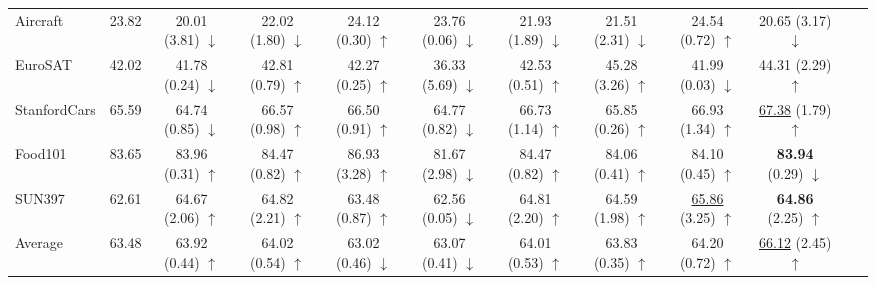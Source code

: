 {\begin{table*}[h!]
\begin{tabular}{lccccccccccc}
Aircraft & 23.82 & 20.01 {\scriptsize (3.81) $\downarrow$} & 22.02 {\scriptsize (1.80) $\downarrow$} & 24.12 {\scriptsize (0.30) $\uparrow$} & 23.76 {\scriptsize (0.06) $\downarrow$} & 21.93 {\scriptsize (1.89) $\downarrow$} & 21.51 {\scriptsize (2.31) $\downarrow$} & 24.54 {\scriptsize (0.72) $\uparrow$} & 20.65 {\scriptsize (3.17) $\downarrow$}  \\
EuroSAT & 42.02 & 41.78 {\scriptsize (0.24) $\downarrow$} & 42.81 {\scriptsize (0.79) $\uparrow$} & 42.27 {\scriptsize (0.25) $\uparrow$} & 36.33 {\scriptsize (5.69) $\downarrow$} & 42.53 {\scriptsize (0.51) $\uparrow$} & 45.28 {\scriptsize (3.26) $\uparrow$} & 41.99 {\scriptsize (0.03) $\downarrow$} & 44.31 {\scriptsize (2.29) $\uparrow$}  \\
StanfordCars & 65.59 & 64.74 {\scriptsize (0.85) $\downarrow$} & 66.57 {\scriptsize (0.98) $\uparrow$} & 66.50 {\scriptsize (0.91) $\uparrow$} & 64.77 {\scriptsize (0.82) $\downarrow$} & 66.73 {\scriptsize (1.14) $\uparrow$} & 65.85 {\scriptsize (0.26) $\uparrow$} & 66.93 {\scriptsize (1.34) $\uparrow$} & \underline{67.38} {\scriptsize (1.79) $\uparrow$}  \\
Food101 & 83.65 & 83.96 {\scriptsize (0.31) $\uparrow$} & 84.47 {\scriptsize (0.82) $\uparrow$} & 86.93 {\scriptsize (3.28) $\uparrow$} & 81.67 {\scriptsize (2.98) $\downarrow$} & 84.47 {\scriptsize (0.82) $\uparrow$} & 84.06 {\scriptsize (0.41) $\uparrow$} & 84.10 {\scriptsize (0.45) $\uparrow$} & \textbf{83.94} {\scriptsize (0.29) $\downarrow$} \\
SUN397 & 62.61 & 64.67 {\scriptsize (2.06) $\uparrow$} & 64.82 {\scriptsize (2.21) $\uparrow$} & 63.48 {\scriptsize (0.87) $\uparrow$} & 62.56 {\scriptsize (0.05) $\downarrow$} & 64.81 {\scriptsize (2.20) $\uparrow$} & 64.59 {\scriptsize (1.98) $\uparrow$}  & \underline{65.86} {\scriptsize (3.25) $\uparrow$} & \textbf{64.86} {\scriptsize (2.25) $\uparrow$} \\
Average & 63.48 & 63.92 {\scriptsize (0.44) $\uparrow$} & 64.02 {\scriptsize (0.54) $\uparrow$} & 63.02 {\scriptsize (0.46) $\downarrow$} & 63.07 {\scriptsize (0.41) $\downarrow$} & 64.01 {\scriptsize (0.53) $\uparrow$} & 63.83 {\scriptsize (0.35) $\uparrow$} & 64.20 {\scriptsize (0.72) $\uparrow$} & \underline{66.12} {\scriptsize (2.45) $\uparrow$}  \\
\hline
\end{tabular}
\end{table*}
}